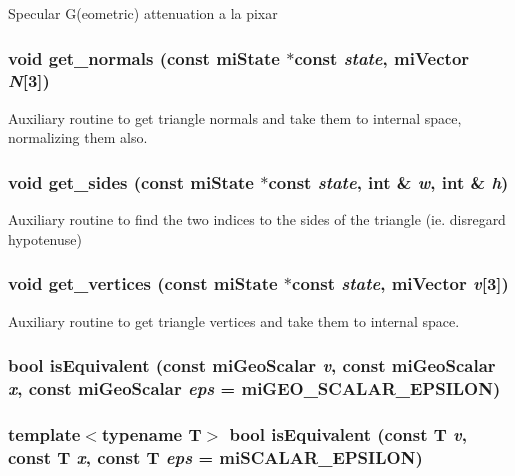 Specular G(eometric) attenuation a la pixar 
\subsubsection{\setlength{\rightskip}{0pt plus 5cm}void get\_\-normals (const mi\-State $\ast$const {\em state}, mi\-Vector {\em N}[3])\hspace{0.3cm}{\tt  [inline]}}\label{namespacemr_a24}


Auxiliary routine to get triangle normals and take them to internal space, normalizing them also. 
\subsubsection{\setlength{\rightskip}{0pt plus 5cm}void get\_\-sides (const mi\-State $\ast$const {\em state}, int \& {\em w}, int \& {\em h})\hspace{0.3cm}{\tt  [inline]}}\label{namespacemr_a35}


Auxiliary routine to find the two indices to the sides of the triangle (ie. disregard hypotenuse) 
\subsubsection{\setlength{\rightskip}{0pt plus 5cm}void get\_\-vertices (const mi\-State $\ast$const {\em state}, mi\-Vector {\em v}[3])\hspace{0.3cm}{\tt  [inline]}}\label{namespacemr_a25}


Auxiliary routine to get triangle vertices and take them to internal space. 
\subsubsection{\setlength{\rightskip}{0pt plus 5cm}bool is\-Equivalent (const mi\-Geo\-Scalar {\em v}, const mi\-Geo\-Scalar {\em x}, const mi\-Geo\-Scalar {\em eps} = mi\-GEO\_\-SCALAR\_\-EPSILON)\hspace{0.3cm}{\tt  [inline]}}\label{namespacemr_a61}


\subsubsection{\setlength{\rightskip}{0pt plus 5cm}template$<$typename T$>$ bool is\-Equivalent (const T {\em v}, const T {\em x}, const T {\em eps} = mi\-SCALAR\_\-EPSILON)\hspace{0.3cm}{\tt  [inline]}}\label{namespacemr_a60}


